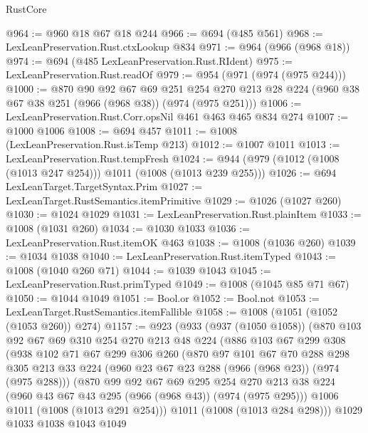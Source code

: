 \begin{lexlean}{RustCore}
\begin{coremodule}
@964 := @960 @18 @67 @18 @244
@966 := @694 (@485 @561)
@968 := LexLeanPreservation.Rust.ctxLookup @834
@971 := @964 (@966 (@968 @18))
@974 := @694 (@485 LexLeanPreservation.Rust.RIdent)
@975 := LexLeanPreservation.Rust.readOf
@979 := @954 (@971 (@974 (@975 @244)))
@1000 := @870
    @90
    @92
    @67
    @69
    @251
    @254
    @270
    @213
    @28
    @224
    (@960 @38 @67 @38 @251 (@966 (@968 @38)) (@974 (@975 @251)))
@1006 := LexLeanPreservation.Rust.Corr.opsNil @461 @463 @465 @834 @274
@1007 := @1000 @1006
@1008 := @694 @457
@1011 := @1008 (LexLeanPreservation.Rust.isTemp @213)
@1012 := @1007 @1011
@1013 := LexLeanPreservation.Rust.tempFresh
@1024 := @944 (@979 (@1012 (@1008 (@1013 @247 @254))) @1011 (@1008 (@1013 @239 @255)))
@1026 := @694 LexLeanTarget.TargetSyntax.Prim
@1027 := LexLeanTarget.RustSemantics.itemPrimitive
@1029 := @1026 (@1027 @260)
@1030 := @1024 @1029
@1031 := LexLeanPreservation.Rust.plainItem
@1033 := @1008 (@1031 @260)
@1034 := @1030 @1033
@1036 := LexLeanPreservation.Rust.itemOK @463
@1038 := @1008 (@1036 @260)
@1039 := @1034 @1038
@1040 := LexLeanPreservation.Rust.itemTyped
@1043 := @1008 (@1040 @260 @71)
@1044 := @1039 @1043
@1045 := LexLeanPreservation.Rust.primTyped
@1049 := @1008 (@1045 @85 @71 @67)
@1050 := @1044 @1049
@1051 := Bool.or
@1052 := Bool.not
@1053 := LexLeanTarget.RustSemantics.itemFallible
@1058 := @1008 (@1051 (@1052 (@1053 @260)) @274)
@1157 := @923
    (@933
      (@937 (@1050 @1058))
      (@870
        @103
        @92
        @67
        @69
        @310
        @254
        @270
        @213
        @48
        @224
        (@886
          @103
          @67
          @299
          @308
          (@938
            @102
            @71
            @67
            @299
            @306
            @260
            (@870
              @97
              @101
              @67
              @70
              @288
              @298
              @305
              @213
              @33
              @224
              (@960 @23 @67 @23 @288 (@966 (@968 @23)) (@974 (@975 @288)))
              (@870
                @99
                @92
                @67
                @69
                @295
                @254
                @270
                @213
                @38
                @224
                (@960 @43 @67 @43 @295 (@966 (@968 @43)) (@974 (@975 @295)))
                @1006
                @1011
                (@1008 (@1013 @291 @254)))
              @1011
              (@1008 (@1013 @284 @298)))
            @1029
            @1033
            @1038
            @1043
            @1049

\end{coremodule}
\end{lexlean}
